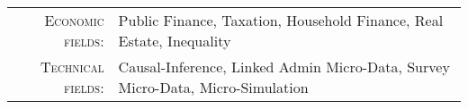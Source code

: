 %
%



\vspace{2.0 mm}

\begin{tabular}{rl}
    \textsc{Economic fields:} & Public Finance, Taxation, Household Finance, Real Estate, Inequality \\
    \textsc{Technical fields:} & Causal-Inference, Linked Admin Micro-Data, Survey Micro-Data, Micro-Simulation \\ 
\end{tabular}

\vspace{4 mm}
